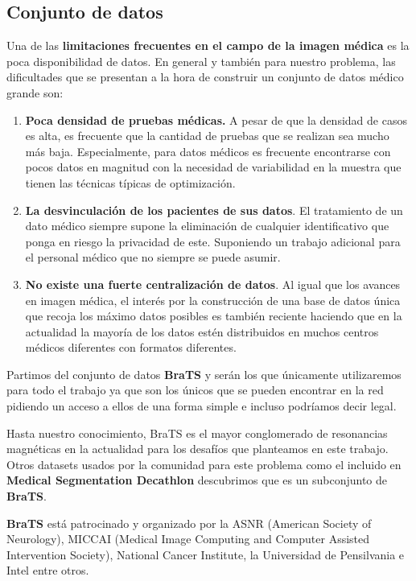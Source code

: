 \subsection{Conjunto de datos}

Una de las \textbf{limitaciones frecuentes en el campo de la imagen médica} es la poca disponibilidad de datos. En general y también para nuestro problema, las dificultades que se presentan a la hora de construir un conjunto de datos médico grande son:

\begin{enumerate}
	\item \textbf{Poca densidad de pruebas médicas.} A pesar de que la densidad de casos es alta, es frecuente que la cantidad de pruebas que se realizan sea mucho más baja. Especialmente, para datos médicos es frecuente encontrarse con pocos datos en magnitud con la necesidad de variabilidad en la muestra que tienen las técnicas típicas de optimización.
	
	\item \textbf{La desvinculación de los pacientes de sus datos}. El tratamiento de un dato médico siempre supone la eliminación de cualquier identificativo que ponga en riesgo la privacidad de este. Suponiendo un trabajo adicional para el personal médico que no siempre se puede asumir.
	
	\item \textbf{No existe una fuerte centralización de datos}. Al igual que los avances en imagen médica, el interés por la construcción de una base de datos única que recoja los máximo datos posibles es también reciente haciendo que en la actualidad la mayoría de los datos estén distribuidos en muchos centros médicos diferentes con formatos diferentes.
	
\end{enumerate}

Partimos del conjunto de datos \textbf{BraTS} y serán los que únicamente utilizaremos para todo el trabajo ya que son los únicos que se pueden encontrar en la red pidiendo un acceso a ellos de una forma simple e incluso podríamos decir legal.

Hasta nuestro conocimiento, BraTS es el mayor conglomerado de resonancias magnéticas en la actualidad para los desafíos que planteamos en este trabajo. Otros datasets usados por la comunidad para este problema como el incluido en \textbf{Medical Segmentation Decathlon} descubrimos que es un subconjunto de \textbf{BraTS}.


\textbf{BraTS} está patrocinado y organizado por la ASNR (American Society of Neurology), MICCAI (Medical Image Computing and Computer Assisted Intervention Society), National Cancer Institute, la Universidad de Pensilvania e Intel entre otros. 

